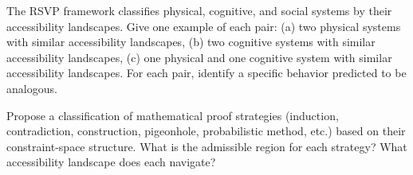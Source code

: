 \begin{exercise}
  The RSVP framework classifies physical, cognitive, and social systems
  by their accessibility landscapes. Give one example of each pair:
  (a) two physical systems with similar accessibility landscapes,
  (b) two cognitive systems with similar accessibility landscapes,
  (c) one physical and one cognitive system with similar accessibility
  landscapes. For each pair, identify a specific behavior predicted
  to be analogous.
\end{exercise}

\begin{exercise}
  Propose a classification of mathematical proof strategies
  (induction, contradiction, construction, pigeonhole, probabilistic
  method, etc.) based on their constraint-space structure.
  What is the admissible region for each strategy?
  What accessibility landscape does each navigate?
\end{exercise}
